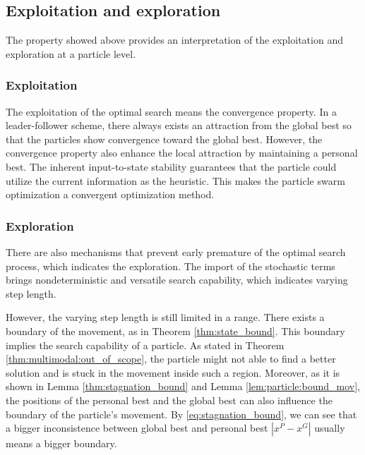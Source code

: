 \subsection{Exploitation and exploration}

The property showed above provides an interpretation of the exploitation and exploration at a particle level.

\subsubsection{Exploitation}

The exploitation of the optimal search means the convergence property.
In a leader-follower scheme, there always exists an attraction from the global best so that the particles show convergence toward the global best.
However, the convergence property also enhance the local attraction by maintaining a personal best.
The inherent input-to-state stability guarantees that the particle could utilize the current information as the heuristic.
This makes the particle swarm optimization a convergent optimization method.

\subsubsection{Exploration}

There are also mechanisms that prevent early premature of the optimal search process, which indicates the exploration.
The import of the stochastic terms brings nondeterministic and versatile search capability, which indicates varying step length.

However, the varying step length is still limited in a range. 
There exists a boundary of the movement, as in Theorem \ref{thm:state_bound}.
This boundary implies the search capability of a particle.
As stated in Theorem \ref{thm:multimodal:out_of_scope}, the particle might not able to find a better solution and is stuck in the movement inside such a region.
Moreover, as it is shown in Lemma \ref{thm:stagnation_bound} and Lemma \ref{lem:particle:bound_mov}, the positions of the personal best and the global best can also influence the boundary of the particle's movement.
By \eqref{eq:stagnation_bound}, we can see that a bigger inconsistence between global best and personal best $ | x^{P} - x^{G} | $ usually means a bigger boundary.



